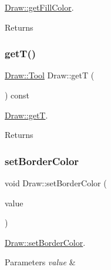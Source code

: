 \hyperlink{class_draw_a4be8a242b92fd9d5c42fe9a40810cdb6}{Draw\+::get\+Fill\+Color}. 

\begin{DoxyReturn}{Returns}

\end{DoxyReturn}
\mbox{\label{class_draw_a051a72609a03e7b21990060d0f306558}} 
\subsubsection{\texorpdfstring{get\+T()}{getT()}}
{\footnotesize\ttfamily \hyperlink{class_draw_aef97a848de7a634c35c3ce678be88b9b}{Draw\+::\+Tool} Draw\+::getT (\begin{DoxyParamCaption}{ }\end{DoxyParamCaption}) const}



\hyperlink{class_draw_a051a72609a03e7b21990060d0f306558}{Draw\+::getT}. 

\begin{DoxyReturn}{Returns}

\end{DoxyReturn}
\mbox{\label{class_draw_a960270765705698a6663fdfe93356d17}} 
\subsubsection{\texorpdfstring{set\+Border\+Color}{setBorderColor}}
{\footnotesize\ttfamily void Draw\+::set\+Border\+Color (\begin{DoxyParamCaption}\item[{const Q\+Color \&}]{value }\end{DoxyParamCaption})\hspace{0.3cm}{\ttfamily [slot]}}



\hyperlink{class_draw_a960270765705698a6663fdfe93356d17}{Draw\+::set\+Border\+Color}. 


\begin{DoxyParams}{Parameters}
{\em value} & \\
\hline
\end{DoxyParams}
\mbox{\label{class_draw_a7d802038dd6aa2afe1a8570dbe681136}} 

